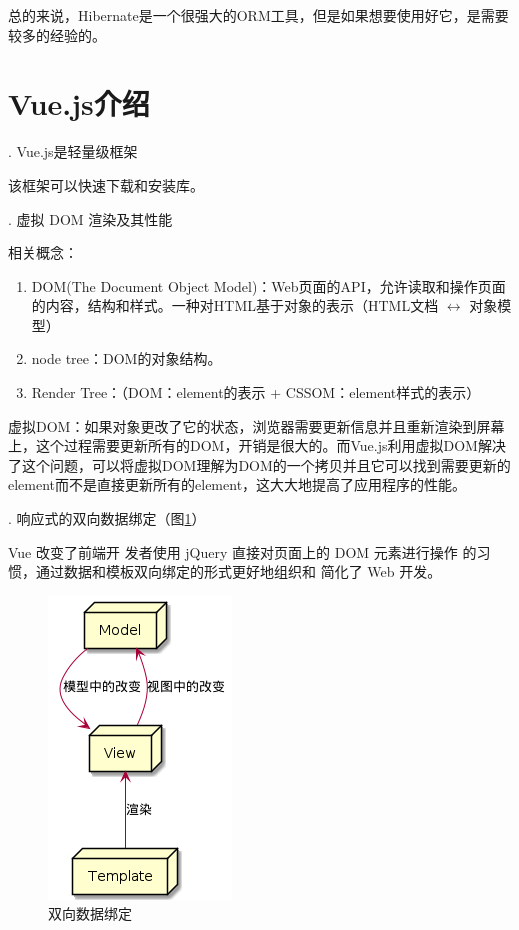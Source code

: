 总的来说，Hibernate是一个很强大的ORM工具，但是如果想要使用好它，是需要较多的经验的。

\section{Vue.js介绍}

. Vue.js是轻量级框架

该框架可以快速下载和安装库。

. 虚拟 DOM 渲染及其性能

相关概念：
\begin{enumerate}
  \item DOM(The Document Object Model)：Web页面的API，允许读取和操作页面的内容，结构和样式。一种对HTML基于对象的表示（HTML文档 $\leftrightarrow$ 对象模型）
  \item node tree：DOM的对象结构。
  \item Render Tree：（DOM：element的表示 + CSSOM：element样式的表示）
\end{enumerate}
虚拟DOM：如果对象更改了它的状态，浏览器需要更新信息并且重新渲染到屏幕上，这个过程需要更新所有的DOM，开销是很大的。而Vue.js利用虚拟DOM解决了这个问题，可以将虚拟DOM理解为DOM的一个拷贝并且它可以找到需要更新的element而不是直接更新所有的element，这大大地提高了应用程序的性能。

. 响应式的双向数据绑定（图\ref{tow-way-date-binding}）

Vue 改变了前端开 发者使用 jQuery 直接对页面上的 DOM 元素进行操作 的习惯，通过数据和模板双向绑定的形式更好地组织和 简化了 Web 开发。\cite{.2020g}

\begin{figure}[htbp]
  \centering
  \includegraphics[scale = 0.6]{out/uml/部署图/Two-way data binding/Two-way data binding.png}
  \caption{\song\wuhao 双向数据绑定}
  \label{tow-way-date-binding}
\end{figure}

